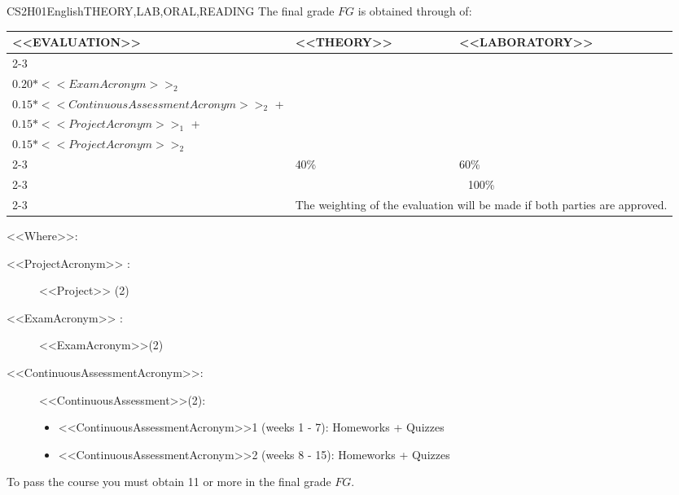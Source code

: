     \begin{evaluation}{CS2H01}{English}{THEORY,LAB,ORAL,READING}
    The final grade $FG$ is obtained through of:
   
    \begin{tabularx}{0.9\textwidth}{|X|p{}|p{}|} \hline
      \multirow{4}{*}{\uppercase{<<Evaluation>>}} & \uppercase{<<Theory>>} & \uppercase{<<Laboratory>>} \\ \cline{2-3}
      & %
          \begin{minipage}{0.95\textwidth}
          \begin{tabular}{l}
              $0.20*<<ExamAcronym>>_{1}$  + \\
              $0.20*<<ExamAcronym>>_{2}$  
          \end{tabular} 
          \end{minipage} 
      & %
          \begin{minipage}{0.95\textwidth}
          \begin{tabular}{l}
              $0.15*<<ContinuousAssessmentAcronym>>_{1}$  + \\
              $0.15*<<ContinuousAssessmentAcronym>>_{2}$  + \\
              $0.15*<<ProjectAcronym>>_{1}$  + \\
              $0.15*<<ProjectAcronym>>_{2}$ 
          \end{tabular} 
          \end{minipage}                 \\ \cline{2-3}
      
      & %
      40\% 
      & %
      60\% \\ \cline{2-3}
      & \multicolumn{2}{|c|}{100\%}  \\ \cline{2-3}
      & \multicolumn{2}{|c|}{The weighting of the evaluation will be made if both parties are approved.}  \\ \hline
      \end{tabularx}
        
      \vspace{2mm}
      \noindent <<Where>>:
      \begin{description}
        \item[<<ProjectAcronym>> :] <<Project>> (2)
        \item[<<ExamAcronym>> :] <<ExamAcronym>>(2)
        \item[<<ContinuousAssessmentAcronym>>:]<<ContinuousAssessment>>(2):
        \begin{itemize}
            \item <<ContinuousAssessmentAcronym>>1 (weeks 1 - 7): Homeworks + Quizzes
            \item <<ContinuousAssessmentAcronym>>2 (weeks 8 - 15): Homeworks + Quizzes
        \end{itemize}
      \end{description}
   
    \noindent To pass the course you must obtain 11 or more in the final grade $FG$.
    \end{evaluation}